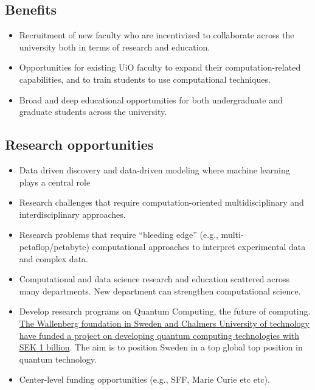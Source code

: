 \documentclass[%
oneside,                 %
final,                   %
10pt]{article}
\begin{document}
\noindent
\subsection{Benefits}

\begin{itemize}
\item Recruitment of new faculty who are incentivized to collaborate across the university both in terms of research and education.

\item Opportunities for existing UiO faculty to expand their computation-related capabilities, and to train students to use computational techniques.	

\item Broad and deep educational opportunities for both undergraduate and graduate students across the university.	
\end{itemize}

\noindent
\subsection{Research opportunities}

\begin{itemize}
\item Data driven discovery and data-driven modeling where machine learning plays a central role

\item Research challenges that require computation-oriented multidisciplinary and interdisciplinary approaches.	

\item Research problems that require “bleeding edge” (e.g., multi-petaflop/petabyte) computational approaches to interpret experimental data and complex data.

\item Computational and data science research and education scattered across many departments. New department can strengthen computational science. 	

\item Develop research programs on Quantum Computing, the future of computing.  \href{{https://www.chalmers.se/en/news/Pages/Engineering-of-a-Swedish-quantum-computer-set-to-start.aspx}}{The Wallenberg foundation in Sweden and Chalmers University of technology have funded a project on developing quantum computing technologies with SEK 1 billion}. The aim is to position  Sweden in  a top global top position in quantum technology. 

\item Center-level funding opportunities (e.g., SFF, Marie Curie etc etc).	
\end{itemize}
\end{document}
